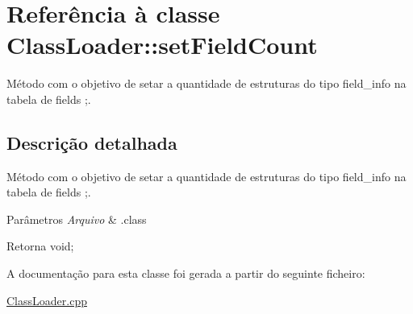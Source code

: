 \hypertarget{class_class_loader_1_1set_field_count}{}\section{Referência à classe Class\+Loader\+:\+:set\+Field\+Count}
\label{class_class_loader_1_1set_field_count}


Método com o objetivo de setar a quantidade de estruturas do tipo field\+\_\+info na tabela de fields ;.  




\subsection{Descrição detalhada}
Método com o objetivo de setar a quantidade de estruturas do tipo field\+\_\+info na tabela de fields ;. 


\begin{DoxyParams}{Parâmetros}
{\em Arquivo} & .class \\
\hline
\end{DoxyParams}
\begin{DoxyReturn}{Retorna}
void; 
\end{DoxyReturn}


A documentação para esta classe foi gerada a partir do seguinte ficheiro\+:\begin{DoxyCompactItemize}
\item 
\hyperlink{_class_loader_8cpp}{Class\+Loader.\+cpp}\end{DoxyCompactItemize}
